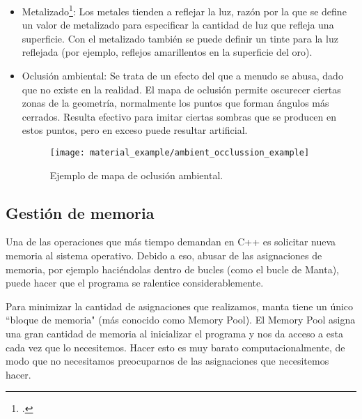 \begin{itemize}
    \item Metalizado\footcite{marmoset_basicpbr}: Los metales tienden a reflejar la luz, razón por la que se define un valor de metalizado para especificar la cantidad de luz que refleja una superficie. Con el metalizado también se puede definir un tinte para la luz reflejada (por ejemplo, reflejos amarillentos en la superficie del oro).
    \item Oclusión ambiental: Se trata de un efecto del que a menudo se abusa, dado que no existe en la realidad. El mapa de oclusión permite oscurecer ciertas zonas de la geometría, normalmente los puntos que forman ángulos más cerrados. Resulta efectivo para imitar ciertas sombras que se producen en estos puntos, pero en exceso puede resultar artificial.
    \begin{figure}[H]
        \centering
        \texttt{[image: material\_example/ambient\_occlussion\_example]}
        \caption{Ejemplo de mapa de oclusión ambiental.}
        \label{fig:occlusion_ex}
    \end{figure}
\end{itemize}

\subsection{Gestión de memoria}
\label{engine_memory}
Una de las operaciones que más tiempo demandan en C++ es solicitar nueva memoria al sistema operativo. Debido a eso, abusar de las asignaciones de memoria, por ejemplo haciéndolas dentro de bucles (como el bucle de Manta), puede hacer que el programa se ralentice considerablemente.

Para minimizar la cantidad de asignaciones que realizamos, manta tiene un único ``bloque de memoria" (más conocido como Memory Pool). El Memory Pool asigna una gran cantidad de memoria al inicializar el programa y nos da acceso a esta cada vez que lo necesitemos. Hacer esto es muy barato computacionalmente, de modo que no necesitamos preocuparnos de las asignaciones que necesitemos hacer.

